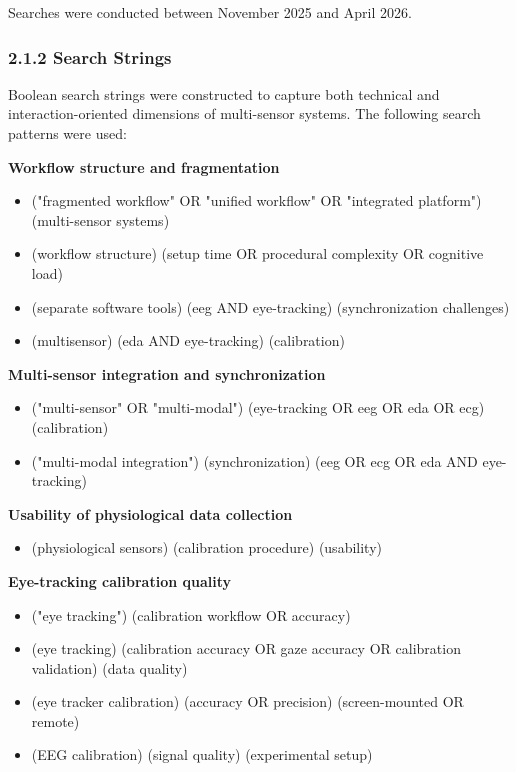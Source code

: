 \documentclass[
]{article}
\begin{document}
Searches were conducted between November 2025 and April 2026.

\hypertarget{search-strings}{%
\subsubsection{2.1.2 Search Strings}\label{search-strings}}

Boolean search strings were constructed to capture both technical and interaction-oriented dimensions of multi-sensor systems. The following search patterns were used:

\textbf{Workflow structure and fragmentation}

\begin{itemize}
\item
  ("fragmented workflow" OR "unified workflow" OR "integrated platform") (multi-sensor systems)
\item
  (workflow structure) (setup time OR procedural complexity OR cognitive load)
\item
  (separate software tools) (eeg AND eye-tracking) (synchronization challenges)
\item
  (multisensor) (eda AND eye-tracking) (calibration)
\end{itemize}

\textbf{Multi-sensor integration and synchronization}

\begin{itemize}
\item
  ("multi-sensor" OR "multi-modal") (eye-tracking OR eeg OR eda OR ecg) (calibration)
\item
  ("multi-modal integration") (synchronization) (eeg OR ecg OR eda AND eye-tracking)
\end{itemize}

\textbf{Usability of physiological data collection}

\begin{itemize}
\item
  (physiological sensors) (calibration procedure) (usability)
\end{itemize}

\textbf{Eye-tracking calibration quality}

\begin{itemize}
\item
  ("eye tracking") (calibration workflow OR accuracy)
\item
  (eye tracking) (calibration accuracy OR gaze accuracy OR calibration validation) (data quality)
\item
  (eye tracker calibration) (accuracy OR precision) (screen-mounted OR remote)
\item
  (EEG calibration) (signal quality) (experimental setup)
\end{itemize}
\end{document}
